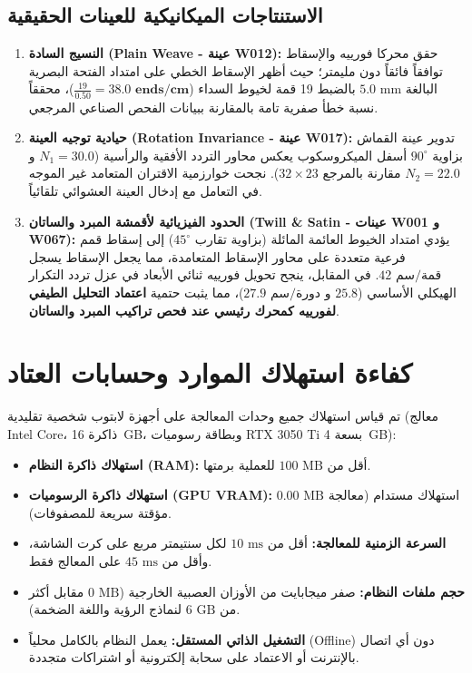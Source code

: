 \documentclass[11pt,a4paper]{article}
\begin{document}
\subsection{الاستنتاجات الميكانيكية للعينات الحقيقية}
\begin{enumerate}
    \item \textbf{النسيج السادة (Plain Weave - عينة W012):} حقق محركا فورييه والإسقاط توافقاً فائقاً دون مليمتر؛ حيث أظهر الإسقاط الخطي على امتداد الفتحة البصرية البالغة $5.0\text{ mm}$ بالضبط 19 قمة لخيوط السداء ($\frac{19}{0.50} = \mathbf{38.0\text{ ends/cm}}$)، محققاً نسبة خطأ صفرية تامة بالمقارنة ببيانات الفحص الصناعي المرجعي.
    \item \textbf{حيادية توجيه العينة (Rotation Invariance - عينة W017):} تدوير عينة القماش بزاوية $90^\circ$ أسفل الميكروسكوب يعكس محاور التردد الأفقية والرأسية ($N_1 = 30.0$ و $N_2 = 22.0$ مقارنة بالمرجع $32\times 23$). نجحت خوارزمية الاقتران المتعامد غير الموجه في التعامل مع إدخال العينة العشوائي تلقائياً.
    \item \textbf{الحدود الفيزيائية لأقمشة المبرد والساتان (Twill \& Satin - عينات W001 و W067):} يؤدي امتداد الخيوط العائمة المائلة (بزاوية تقارب $45^\circ$) إلى إسقاط قمم فرعية متعددة على محاور الإسقاط المتعامدة، مما يجعل الإسقاط يسجل $42\text{ قمة/سم}$. في المقابل، ينجح تحويل فورييه ثنائي الأبعاد في عزل تردد التكرار الهيكلي الأساسي ($25.8$ و $27.9\text{ دورة/سم}$)، مما يثبت حتمية \textbf{اعتماد التحليل الطيفي لفورييه كمحرك رئيسي عند فحص تراكيب المبرد والساتان}.
\end{enumerate}

\section{كفاءة استهلاك الموارد وحسابات العتاد}

تم قياس استهلاك جميع وحدات المعالجة على أجهزة لابتوب شخصية تقليدية (معالج Intel Core، ذاكرة 16~GB، وبطاقة رسوميات RTX 3050 Ti بسعة 4~GB):
\begin{itemize}
    \item \textbf{استهلاك ذاكرة النظام (RAM):} أقل من $100\text{ MB}$ للعملية برمتها.
    \item \textbf{استهلاك ذاكرة الرسوميات (GPU VRAM):} $0.00\text{ MB}$ استهلاك مستدام (معالجة مؤقتة سريعة للمصفوفات).
    \item \textbf{السرعة الزمنية للمعالجة:} أقل من $10\text{ ms}$ لكل سنتيمتر مربع على كرت الشاشة، وأقل من $45\text{ ms}$ على المعالج فقط.
    \item \textbf{حجم ملفات النظام:} صفر ميجابايت من الأوزان العصبية الخارجية ($0\text{ MB}$ مقابل أكثر من $6\text{ GB}$ لنماذج الرؤية واللغة الضخمة).
    \item \textbf{التشغيل الذاتي المستقل:} يعمل النظام بالكامل محلياً (Offline) دون أي اتصال بالإنترنت أو الاعتماد على سحابة إلكترونية أو اشتراكات متجددة.
\end{itemize}
\end{document}

